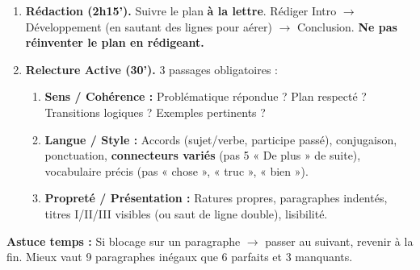 \documentclass[11pt]{article}
\begin{document}
\begin{methode}
\begin{enumerate}
\begin{center}
\begin{tabularx}{\linewidth}{|>{\bfseries}X|X|X|}
        \end{tabularx}
        \end{center}
        \textbf{Règle :} Chaque case « Arguments » = 1 paragraphe (donc 9 paragraphes au total). Vérifier l'équilibre (3 parties $\times$ 3 §).
    \item \textbf{Rédaction (2h15').} Suivre le plan \textbf{à la lettre}. Rédiger Intro $\to$ Développement (en sautant des lignes pour aérer) $\to$ Conclusion. \textbf{Ne pas réinventer le plan en rédigeant.}
    \item \textbf{Relecture Active (30').} 3 passages obligatoires :
        \begin{enumerate}
            \item \textbf{Sens / Cohérence :} Problématique répondue ? Plan respecté ? Transitions logiques ? Exemples pertinents ?
            \item \textbf{Langue / Style :} Accords (sujet/verbe, participe passé), conjugaison, ponctuation, \textbf{connecteurs variés} (pas 5 « De plus » de suite), vocabulaire précis (pas « chose », « truc », « bien »).
            \item \textbf{Propreté / Présentation :} Ratures propres, paragraphes indentés, titres I/II/III visibles (ou saut de ligne double), lisibilité.
        \end{enumerate}
\end{enumerate}
\textbf{Astuce temps :} Si blocage sur un paragraphe $\to$ passer au suivant, revenir à la fin. Mieux vaut 9 paragraphes inégaux que 6 parfaits et 3 manquants.
\end{methode}
\end{document}
